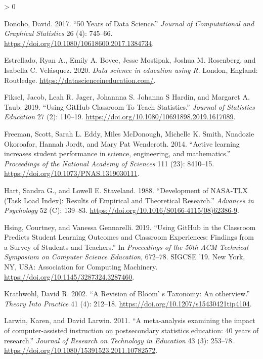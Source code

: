 \documentclass[
]{article}
\newlength{\cslhangindent}
\newenvironment{CSLReferences}[2] %
 {%
  \setlength{\parindent}{0pt}
  \ifodd #1 \everypar{\setlength{\hangindent}{\cslhangindent}}\ignorespaces\fi
  \ifnum #2 > 0
  \setlength{\parskip}{#2\baselineskip}
  \fi
 }%
 {}
\begin{document}
\begin{CSLReferences}{1}{0}
\leavevmode\hypertarget{ref-Donoho2017}{}%
Donoho, David. 2017. {``{50 Years of Data Science}.''} \emph{Journal of
Computational and Graphical Statistics} 26 (4): 745--66.
\url{https://doi.org/10.1080/10618600.2017.1384734}.

\leavevmode\hypertarget{ref-Estrellado2020}{}%
Estrellado, Ryan A., Emily A. Bovee, Jesse Mostipak, Joshua M.
Rosenberg, and Isabella C. Velásquez. 2020. \emph{{Data science in
education using R}}. London, England: Routledge.
\url{https://datascienceineducation.com/}.

\leavevmode\hypertarget{ref-Fiksel2019}{}%
Fiksel, Jacob, Leah R. Jager, Johannna S. Johanna S Hardin, and Margaret
A. Taub. 2019. {``{Using GitHub Classroom To Teach Statistics}.''}
\emph{Journal of Statistics Education} 27 (2): 110--19.
\url{https://doi.org/10.1080/10691898.2019.1617089}.

\leavevmode\hypertarget{ref-Freeman2014}{}%
Freeman, Scott, Sarah L. Eddy, Miles McDonough, Michelle K. Smith,
Nnadozie Okoroafor, Hannah Jordt, and Mary Pat Wenderoth. 2014.
{``{Active learning increases student performance in science,
engineering, and mathematics}.''} \emph{Proceedings of the National
Academy of Sciences} 111 (23): 8410--15.
\url{https://doi.org/10.1073/PNAS.1319030111}.

\leavevmode\hypertarget{ref-Hart1988}{}%
Hart, Sandra G., and Lowell E. Staveland. 1988. {``{Development of
NASA-TLX (Task Load Index): Results of Empirical and Theoretical
Research}.''} \emph{Advances in Psychology} 52 (C): 139--83.
\url{https://doi.org/10.1016/S0166-4115(08)62386-9}.

\leavevmode\hypertarget{ref-Hsing2019}{}%
Hsing, Courtney, and Vanessa Gennarelli. 2019. {``{Using GitHub in the
Classroom Predicts Student Learning Outcomes and Classroom Experiences:
Findings from a Survey of Students and Teachers}.''} In
\emph{Proceedings of the 50th ACM Technical Symposium on Computer
Science Education}, 672--78. SIGCSE '19. New York, NY, USA: Association
for Computing Machinery. \url{https://doi.org/10.1145/3287324.3287460}.

\leavevmode\hypertarget{ref-Krathwohl2002}{}%
Krathwohl, David R. 2002. {``{A Revision of Bloom' s Taxonomy: An
otherview}.''} \emph{Theory Into Practice} 41 (4): 212--18.
\url{https://doi.org/10.1207/s15430421tip4104}.

\leavevmode\hypertarget{ref-Larwin2011}{}%
Larwin, Karen, and David Larwin. 2011. {``{A meta-analysis examining the
impact of computer-assisted instruction on postsecondary statistics
education: 40 years of research}.''} \emph{Journal of Research on
Technology in Education} 43 (3): 253--78.
\url{https://doi.org/10.1080/15391523.2011.10782572}.


\end{CSLReferences}
\end{document}
